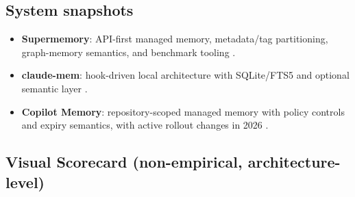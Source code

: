 \documentclass[10pt,twocolumn]{article}
\begin{document}
\subsection{System snapshots}
\begin{itemize}
  \item \textbf{Supermemory}: API-first managed memory, metadata/tag partitioning, graph-memory semantics, and benchmark tooling \cite{sm-intro,sm-create,sm-filter,sm-graph,sm-bench}.
  \item \textbf{claude-mem}: hook-driven local architecture with SQLite/FTS5 and optional semantic layer \cite{cm-overview,cm-hooks,cm-db,cm-search}.
  \item \textbf{Copilot Memory}: repository-scoped managed memory with policy controls and expiry semantics, with active rollout changes in 2026 \cite{gh-memory-docs,gh-changelog-jan2026,gh-changelog-mar2026}.
\end{itemize}

\subsection{Visual Scorecard (non-empirical, architecture-level)}
\begin{table}[t]
\centering
\scriptsize
\setlength{\tabcolsep}{3pt}
\caption{Architecture-level scorecard from documented behavior (H=high, M=medium, L=low). Not a substitute for empirical benchmark results.}
\label{tab:scorecard}
\end{table}
\end{document}
